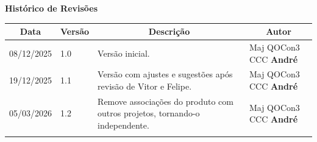 \begin{table}[h]
	\begin{center}
	    \textbf{\Huge{Histórico de Revisões}}
	\end{center}
    \centering
	\begin{tabular}{|p{3cm}|p{1.5cm}|p{7.5cm}|p{3.2cm}|}
		\hline \multicolumn{1}{|c|}{\textbf{Data}} & \multicolumn{1}{|c|}{\textbf{Versão}} &
			\multicolumn{1}{|c|}{\textbf{Descrição}} & \multicolumn{1}{|c|}{\textbf{Autor}} \\ \hline
		08/12/2025 & 1.0 & Versão inicial. & Maj QOCon3 CCC \textbf{André} \\ \hline
		19/12/2025 & 1.1 & Versão com ajustes e sugestões após revisão de Vitor e Felipe. & Maj QOCon3 CCC \textbf{André} \\ \hline
		05/03/2026 & 1.2 & Remove associações do produto com outros projetos, tornando-o independente. & Maj QOCon3 CCC \textbf{André} \\ \hline
		& & & \\ \hline
	\end{tabular}
\end{table}